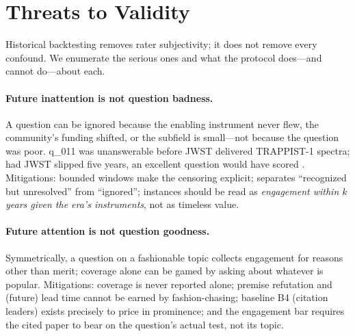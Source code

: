 \section{Threats to Validity}
\label{sec:threats}

Historical backtesting removes rater subjectivity; it does not remove
every confound. We enumerate the serious ones and what the protocol
does---and cannot do---about each.

\paragraph{Future inattention is not question badness.} A question can
be ignored because the enabling instrument never flew, the community's
funding shifted, or the subfield is small---not because the question was
poor. q\_011 was unanswerable before JWST delivered TRAPPIST-1 spectra;
had JWST slipped five years, an excellent question would have scored
. Mitigations: bounded windows make the
censoring explicit;  separates
``recognized but unresolved'' from ``ignored''; instances should be
read as \emph{engagement within $k$ years given the era's instruments},
not as timeless value.

\paragraph{Future attention is not question goodness.} Symmetrically, a
question on a fashionable topic collects engagement for reasons other
than merit; coverage alone can be gamed by asking about whatever is
popular. Mitigations: coverage is never reported alone; premise
refutation and (future) lead time cannot be earned by fashion-chasing;
baseline B4 (citation leaders) exists precisely to price in prominence;
and the engagement bar requires the cited paper to bear on the
question's actual test, not its topic.

